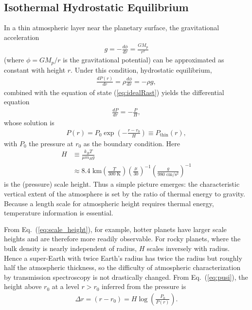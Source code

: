 \subsection*{Isothermal Hydrostatic Equilibrium \label{ss:atmscal}}

In a thin atmospheric layer near the planetary surface, the gravitational acceleration
\begin{eqnarray}
g = - \frac{d \phi}{d r} = \frac{G M_p}{r^2}
\end{eqnarray}
(where $\phi=G M_p/r$ is the gravitational potential) can be approximated as constant with height $r$. Under this condition, hydrostatic equilibrium,
\begin{eqnarray}
\label{eq:pressureeq}
\frac{d P(r)}{d r}  = \rho \frac{d \phi}{d r} =  - \rho g ,
\end{eqnarray}
combined with the equation of state (\ref{eq:idealRast}) yields the differential equation
\begin{eqnarray}
\frac{d P}{d r} = - \frac{P}{H} ,
\end{eqnarray}
whose solution is
\begin{eqnarray}
\label{eq:pusi}
P(r) = P_0 \exp{\left( -\frac{r-r_0}{H} \right) } \equiv P_\mathrm{thin} (r) ,
\end{eqnarray}
with $P_0$ the pressure at $r_0$ as the boundary condition. Here
\begin{align}
\label{eq:scale_height}
H &\equiv \frac{k_B T}{\mu m_H g} \\
&\approx 8.4 \,\, \mathrm{km} \left( \frac{T}{300 \,\, \mathrm{K}} \right)
 \left( \frac{\mu}{30} \right)^{-1} \left( \frac{g}{980 \,\, \mathrm{cm/s^2}} \right)^{-1}
\end{align}
is the (pressure) scale height. Thus a simple picture emerges: the characteristic vertical extent of the atmosphere is set by the ratio of thermal energy to gravity. Because a length scale for atmospheric height requires thermal energy, temperature information is essential.

From Eq.~(\ref{eq:scale_height}), for example, hotter planets have larger scale heights and are therefore more readily observable. For rocky planets, where the bulk density is nearly independent of radius, $H$ scales inversely with radius. Hence a super-Earth with twice Earth’s radius has twice the radius but roughly half the atmospheric thickness, so the difficulty of atmospheric characterization by transmission spectroscopy is not drastically changed. From Eq.~(\ref{eq:pusi}), the height above $r_0$ at a level $r>r_0$ inferred from the pressure is
\begin{eqnarray}
\Delta r = (r - r_0) = H \log{\left(\frac{P_0}{P(r)}\right)} .
\end{eqnarray}

